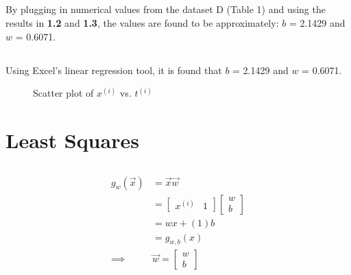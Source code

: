 \documentclass{article}
\begin{document}
\subsection{}
By plugging in numerical values from the dataset D (Table 1) and using the results in \textbf{1.2} and \textbf{1.3}, the values are found to be approximately: $b$ = 2.1429 and $w$ = 0.6071.



\subsection{}
Using Excel's linear regression tool, it is found that $b$ = 2.1429 and $w$ = 0.6071.


\begin{figure}[ht]
  \centering
  \caption{Scatter plot of $x^{(i)}$ vs. $t^{(i)}$}
\end{figure}


\section{Least Squares}
\subsection{}
\begin{align*}
g_w(\vec{x}) &= \vec{x}\vec{w} \\
&= \begin{bmatrix} x^{(i)} & 1 \end{bmatrix} \begin{bmatrix} w \\ b \end{bmatrix} \\ %
&= wx + (1)b \\
&= g_{w, b} (x) \\
\implies & \boxed{	 \vec{w} = 	 \begin{bmatrix} w \\ b \end{bmatrix}	} 
\end{align*}
\end{document}
